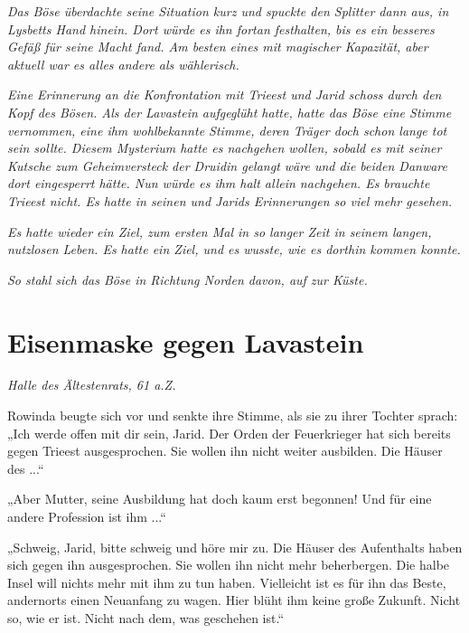 \textit{Das Böse überdachte seine Situation kurz und spuckte den Splitter dann aus, in Lysbetts Hand hinein. Dort würde es ihn fortan festhalten, bis es ein besseres Gefäß für seine Macht fand. Am besten eines mit magischer Kapazität, aber aktuell war es alles andere als wählerisch.}

\textit{Eine Erinnerung an die Konfrontation mit Trieest und Jarid schoss durch den Kopf des Bösen. Als der Lavastein aufgeglüht hatte, hatte das Böse eine Stimme vernommen, eine ihm wohlbekannte Stimme, deren Träger doch schon lange tot sein sollte. Diesem Mysterium hatte es nachgehen wollen, sobald es mit seiner Kutsche zum Geheimversteck der Druidin gelangt wäre und die beiden Danware dort eingesperrt hätte. Nun würde es ihm halt allein nachgehen. Es brauchte Trieest nicht. Es hatte in seinen und Jarids Erinnerungen so viel mehr gesehen.}

\textit{Es hatte wieder ein Ziel, zum ersten Mal in so langer Zeit in seinem langen, nutzlosen Leben. Es hatte ein Ziel, und es wusste, wie es dorthin kommen konnte.}

\textit{So stahl sich das Böse in Richtung Norden davon, auf zur Küste.}










\newpage
\section{Eisenmaske gegen Lavastein}




\textit{Halle des Ältestenrats, 61 a.Z.}\bigskip



Rowinda beugte sich vor und senkte ihre Stimme, als sie zu ihrer Tochter sprach: „Ich werde offen mit dir sein, Jarid. Der Orden der Feuerkrieger hat sich bereits gegen Trieest ausgesprochen. Sie wollen ihn nicht weiter ausbilden. Die Häuser des ...“

„Aber Mutter, seine Ausbildung hat doch kaum erst begonnen! Und für eine andere Profession ist ihm ...“

„Schweig, Jarid, bitte schweig und höre mir zu. Die Häuser des Aufenthalts haben sich gegen ihn ausgesprochen. Sie wollen ihn nicht mehr beherbergen. Die halbe Insel will nichts mehr mit ihm zu tun haben. Vielleicht ist es für ihn das Beste, andernorts einen Neuanfang zu wagen. Hier blüht ihm keine große Zukunft. Nicht so, wie er ist. Nicht nach dem, was geschehen ist.“


